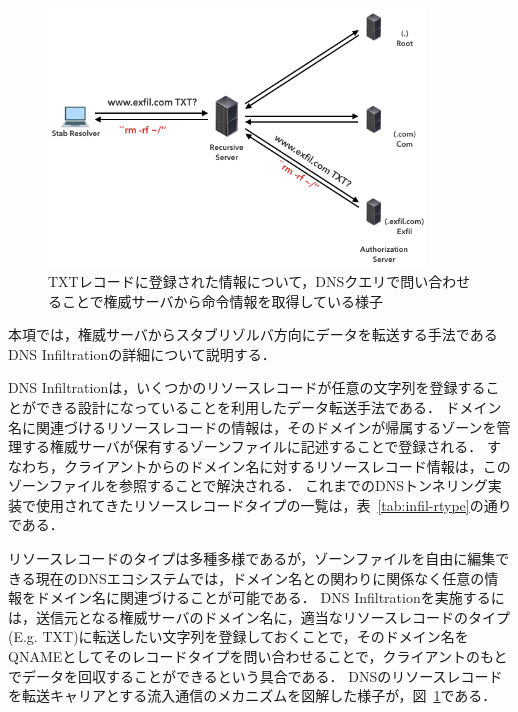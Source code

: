\begin{figure}[h]
 \centering
 \includegraphics[width=10.0cm]{figure/dns-infiltration.png}
 \caption{TXTレコードに登録された情報について，DNSクエリで問い合わせることで権威サーバから命令情報を取得している様子}
 \label{fig:dns-infiltration}
\end{figure}

本項では，権威サーバからスタブリゾルバ方向にデータを転送する手法であるDNS Infiltrationの詳細について説明する．

DNS Infiltrationは，いくつかのリソースレコードが任意の文字列を登録することができる設計になっていることを利用したデータ転送手法である．
ドメイン名に関連づけるリソースレコードの情報は，そのドメインが帰属するゾーンを管理する権威サーバが保有するゾーンファイルに記述することで登録される．
すなわち，クライアントからのドメイン名に対するリソースレコード情報は，このゾーンファイルを参照することで解決される．
これまでのDNSトンネリング実装で使用されてきたリソースレコードタイプの一覧は，表~\ref{tab:infil-rtype}の通りである．



リソースレコードのタイプは多種多様であるが，ゾーンファイルを自由に編集できる現在のDNSエコシステムでは，ドメイン名との関わりに関係なく任意の情報をドメイン名に関連づけることが可能である．
DNS Infiltrationを実施するには，送信元となる権威サーバのドメイン名に，適当なリソースレコードのタイプ(E.g. TXT)に転送したい文字列を登録しておくことで，そのドメイン名をQNAMEとしてそのレコードタイプを問い合わせることで，クライアントのもとでデータを回収することができるという具合である．
DNSのリソースレコードを転送キャリアとする流入通信のメカニズムを図解した様子が，図~\ref{fig:dns-infiltration}である．



